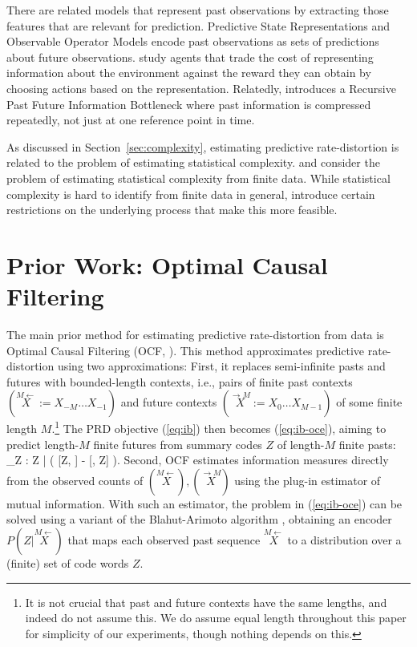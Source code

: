 \documentclass[entropy,article,submit,moreauthors,pdftex,10pt,a4paper]{Definitions/mdpi}
\newcommand{\finitefuture}{\stackrel{\rightarrow \scriptscriptstyle{M}}{X}}
\newcommand{\finitepast}{\stackrel{\scriptscriptstyle{M}\leftarrow}{X}}%
\let\oldequation\equation
\let\oldendequation\endequation
\renewenvironment{equation}
  {\linenomathNonumbers\oldequation}
  {\oldendequation\endlinenomath}
\begin{document}
There are related models that represent past observations by extracting those features that are relevant for prediction.
Predictive State Representations \citep{singh-learning-2003,singh-predictive-2004} and Observable Operator Models \citep{jaeger1998discrete} encode past observations as sets of predictions about future observations.
\citet{rubin2012trading} study agents that trade the cost of representing information about the environment against the reward they can obtain by choosing actions based on the representation.
Relatedly, \citet{still-information-2014} introduces a Recursive Past Future Information Bottleneck where past information is compressed repeatedly, not just at one reference point in time.


As discussed in Section~\ref{sec:complexity}, estimating predictive rate-distortion is related to the problem of estimating statistical complexity.
\citet{clarke2003application} and \citet{still-optimal-2010} consider the problem of estimating statistical complexity from finite data.
While statistical complexity is hard to identify from finite data in general, \citet{clarke2003application} introduce certain restrictions on the underlying process that make this more feasible.





\section{Prior Work: Optimal Causal Filtering}\label{sec:OCF}

The main prior method for estimating predictive rate-distortion from data is Optimal Causal Filtering (OCF, \citet{still-optimal-2010}).
This method approximates predictive rate-distortion using two approximations:
First, it replaces semi-infinite pasts and futures with bounded-length contexts, i.e., pairs of finite past contexts $(\finitepast := X_{-M}\dots X_{-1})$ and future contexts $(\finitefuture := X_{0}\dots X_{M-1})$ of some finite length $M$.\footnote{It is not crucial that past and future contexts have the same lengths, and indeed \citet{still-optimal-2010} do not assume this. We do assume equal length throughout this paper for simplicity of our experiments, though nothing depends on this.}
The PRD objective (\ref{eq:ib}) then becomes (\ref{eq:ib-oce}), aiming to predict length-$M$ finite futures from summary codes $Z$ of length-$M$ finite pasts:
\begin{equation}\label{eq:ib-oce}
	\max_{Z : Z \bot \finitefuture | \finitepast} \left( [Z, \finitefuture] - \lambda \cdot {}[\finitepast, Z] \right).
\end{equation}
Second, OCF estimates information measures directly from the observed counts of $(\finitepast), (\finitefuture)$ using the plug-in estimator of mutual information. 
With such an estimator, the problem in (\ref{eq:ib-oce}) can be solved using a variant of the Blahut-Arimoto algorithm \citep{tishby-information-1999}, obtaining an encoder $P(Z|\finitepast)$ that maps each observed past sequence $\finitepast$ to a distribution over a (finite) set of code words $Z$.
\end{document}
